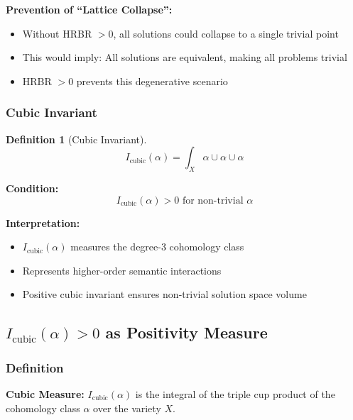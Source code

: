 \documentclass[11pt, letterpaper]{article}
\newtheorem{definition}[theorem]{Definition}
\begin{document}
\textbf{Prevention of ``Lattice Collapse'':}
\begin{itemize}
    \item Without HRBR $> 0$, all solutions could collapse to a single trivial point
    \item This would imply: All solutions are equivalent, making all problems trivial
    \item HRBR $> 0$ prevents this degenerative scenario
\end{itemize}

\subsubsection{Cubic Invariant}

\begin{definition}[Cubic Invariant]
\begin{equation}
I_{\text{cubic}}(\alpha) = \int_X \alpha \cup \alpha \cup \alpha
\end{equation}
\end{definition}

\textbf{Condition:}
\begin{equation}
I_{\text{cubic}}(\alpha) > 0 \text{ for non-trivial } \alpha
\end{equation}

\textbf{Interpretation:}
\begin{itemize}
    \item $I_{\text{cubic}}(\alpha)$ measures the degree-3 cohomology class
    \item Represents higher-order semantic interactions
    \item Positive cubic invariant ensures non-trivial solution space volume
\end{itemize}

\subsection{\texorpdfstring{$I_{\text{cubic}}(\alpha) > 0$ as Positivity Measure}{I-cubic(alpha) > 0 as Positivity Measure}}

\subsubsection{Definition}

\textbf{Cubic Measure:} $I_{\text{cubic}}(\alpha)$ is the integral of the triple cup product of the cohomology class $\alpha$ over the variety $X$.
\end{document}
